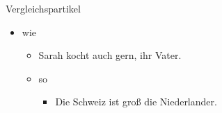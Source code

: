 \begin{syntax}{Vergleichspartikel}{}
\begin{itemize}
	\item wie \begin{itemize}
		\item Sarah kocht auch gern,  ihr Vater.
		\item so \adjhere {} \begin{itemize}
				\item Die Schweiz ist  groß  die Niederlander.
			\end{itemize}
	\end{itemize}
\end{itemize}
\end{syntax}
